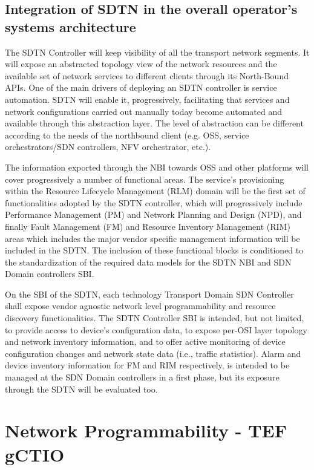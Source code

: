 \documentclass[a4paper,fleqn]{cas-dc}
\begin{document}
\subsection{Integration of SDTN in the overall operator’s systems architecture}
\label{section:sdtn}
The SDTN Controller will keep visibility of all the transport network segments. It will expose an abstracted topology view of the network resources and the available set of network services to different clients through its North-Bound APIs.  
One of the main drivers of deploying an SDTN controller is service automation. SDTN will enable it, progressively, facilitating that services and network configurations carried out manually today become automated and available through this abstraction layer.  The level of abstraction can be different according to the needs of the northbound client (e.g. OSS, service orchestrators/SDN controllers, NFV orchestrator, etc.). 

The information exported through the NBI towards OSS and other platforms will cover progressively a number of functional areas. The service’s provisioning within the Resource Lifecycle Management (RLM) domain will be the first set of functionalities adopted by the SDTN controller, which will progressively include Performance Management (PM) and Network Planning and Design (NPD), and finally Fault Management (FM) and Resource Inventory Management (RIM) areas which includes the major vendor specific management information will be included in the SDTN. The inclusion of these functional blocks is conditioned to the standardization of the required data models for the SDTN NBI and SDN Domain controllers SBI. 

On the SBI of the SDTN, each technology Transport Domain SDN Controller shall expose vendor agnostic network level programmability and resource discovery functionalities. The SDTN Controller SBI is intended, but not limited, to provide access to device’s configuration data, to expose per-OSI layer topology and network inventory information, and to offer active monitoring of device configuration changes and network state data (i.e., traffic statistics). Alarm and device inventory information for FM and RIM respectively, is intended to be managed at the SDN Domain controllers in a first phase, but its exposure through the SDTN will be evaluated too.


\section{Network Programmability - TEF gCTIO}
\label{section:net}
\end{document}
